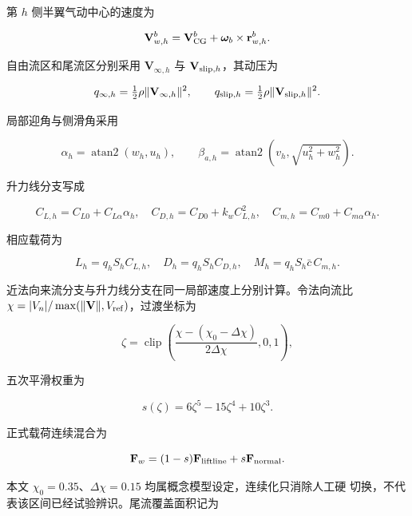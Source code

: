 \documentclass[UTF8,12pt,oneside,openany,fontset=windows]{ctexbook}
\begin{document}
第 \(h\) 侧半翼气动中心的速度为

\begin{equation}
\mathbf V_{w,h}^b=\mathbf V_{\rm CG}^b+\boldsymbol\omega_b\times\mathbf r_{w,h}^b .
\end{equation}

自由流区和尾流区分别采用 \(\mathbf V_{\infty,h}\) 与 \(\mathbf V_{{\rm slip},h}\)，其动压为

\begin{equation}
q_{\infty,h}=\tfrac12\rho\|\mathbf V_{\infty,h}\|^2,\qquad
q_{{\rm slip},h}=\tfrac12\rho\|\mathbf V_{{\rm slip},h}\|^2.
\end{equation}

局部迎角与侧滑角采用

\begin{equation}
\alpha_h=\operatorname{atan2}(w_h,u_h),\qquad
\beta_{a,h}=\operatorname{atan2}(v_h,\sqrt{u_h^2+w_h^2}).
\end{equation}

升力线分支写成

\begin{equation}
C_{L,h}=C_{L0}+C_{L\alpha}\alpha_h,\quad
C_{D,h}=C_{D0}+k_wC_{L,h}^2,\quad
C_{m,h}=C_{m0}+C_{m\alpha}\alpha_h .
\end{equation}

相应载荷为

\begin{equation}
L_h=q_hS_hC_{L,h},\quad D_h=q_hS_hC_{D,h},\quad
M_h=q_hS_h\bar c\,C_{m,h}.
\end{equation}

近法向来流分支与升力线分支在同一局部速度上分别计算。令法向流比 \(\chi=|V_n|/\max(\|\mathbf V\|,V_{\rm ref})\)，过渡坐标为

\begin{equation}
\zeta=\operatorname{clip}\left(\frac{\chi-(\chi_0-\Delta\chi)}
{2\Delta\chi},0,1\right),
\end{equation}

五次平滑权重为

\begin{equation}
s(\zeta)=6\zeta^5-15\zeta^4+10\zeta^3.
\end{equation}

正式载荷连续混合为

\begin{equation}
\mathbf F_w=(1-s)\mathbf F_{\rm liftline}+s\mathbf F_{\rm normal}.
\end{equation}

本文 \(\chi_0=0.35\)、\(\Delta\chi=0.15\) 均属概念模型设定，连续化只消除人工硬 切换，不代表该区间已经试验辨识。尾流覆盖面积记为
\end{document}
